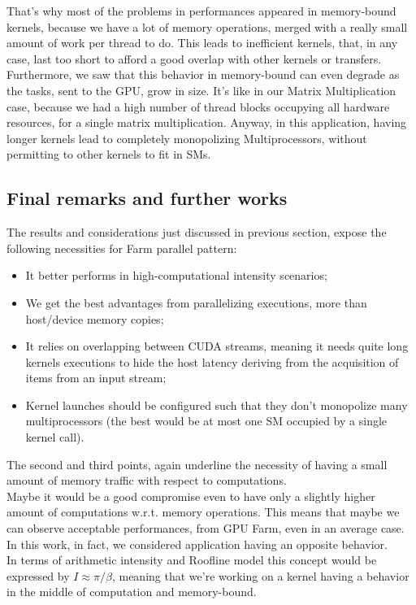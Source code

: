  That's why most of the problems in performances appeared in memory-bound kernels, because we have a lot of memory operations, merged with a really small amount of work per thread to do. This leads to inefficient kernels, that, in any case, last too short to afford a good overlap with other kernels or transfers.\\
 Furthermore, we saw that this behavior in memory-bound can even degrade as the tasks, sent to the GPU, grow in size. It's like in our Matrix Multiplication case, because we had a high number of thread blocks occupying all hardware resources, for a single matrix multiplication. Anyway, in this application, having longer kernels lead to completely monopolizing Multiprocessors, without permitting to other kernels to fit in SMs. \\
 
 


\subsection{Final remarks and further works}
The results and considerations just discussed in previous section, expose the following necessities for Farm parallel pattern: 
\begin{itemize}
	\item It better performs in high-computational intensity scenarios;
	\item We get the best advantages from parallelizing executions, more than host/device memory copies;
	\item It relies on overlapping between CUDA streams, meaning it needs quite long kernels executions to hide the host latency deriving from the acquisition of items from an input stream;
	\item Kernel launches should be configured such that they don't monopolize many multiprocessors (the best would be at most one SM occupied by a single kernel call). 
\end{itemize}
The second and third points, again underline the necessity of having a small amount of memory traffic with respect to computations.\\
Maybe it would be a good compromise even to have only a slightly higher amount of computations w.r.t. memory operations.
This means that maybe we can observe acceptable performances, from GPU Farm, even in an average case.\\
In this work, in fact, we considered application having an opposite behavior.\\
In terms of arithmetic intensity and Roofline model this concept would be expressed by \( I \approx \pi /\beta \), meaning that we're working on a kernel having a behavior in the middle of computation and memory-bound.\\

